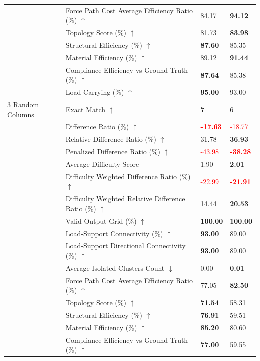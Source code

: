 \begin{table}[!h]
{\begin{tabular}{llll}
 & Force Path Cost Average Efficiency Ratio (\%) $\uparrow$ & 84.17 & \textbf{94.12} \\
 & Topology Score (\%) $\uparrow$ & 81.73 & \textbf{83.98} \\
 & Structural Efficiency (\%) $\uparrow$ & \textbf{87.60} & 85.35 \\
 & Material Efficiency (\%) $\uparrow$ & 89.12 & \textbf{91.44} \\
 & Compliance Efficiency vs Ground Truth (\%) $\uparrow$ & \textbf{87.64} & 85.38 \\
 & Load Carrying (\%) $\uparrow$ & \textbf{95.00} & 93.00 \\
3 Random Columns & Exact Match $\uparrow$ & \textbf{7} & 6 \\
 & Difference Ratio (\%) $\uparrow$ & \textbf{\textcolor{red}{-17.63}} & \textcolor{red}{-18.77} \\
 & Relative Difference Ratio (\%) $\uparrow$ & 31.78 & \textbf{36.93} \\
 & Penalized Difference Ratio (\%) $\uparrow$ & \textcolor{red}{-43.98} & \textbf{\textcolor{red}{-38.28}} \\
 & Average Difficulty Score & 1.90 & \textbf{2.01} \\
 & Difficulty Weighted Difference Ratio (\%) $\uparrow$ & \textcolor{red}{-22.99} & \textbf{\textcolor{red}{-21.91}} \\
 & Difficulty Weighted Relative Difference Ratio (\%) $\uparrow$ & 14.44 & \textbf{20.53} \\
 & Valid Output Grid (\%) $\uparrow$ & \textbf{100.00} & \textbf{100.00} \\
 & Load-Support Connectivity (\%) $\uparrow$ & \textbf{93.00} & 89.00 \\
 & Load-Support Directional Connectivity (\%) $\uparrow$ & \textbf{93.00} & 89.00 \\
 & Average Isolated Clusters Count $\downarrow$ & 0.00 & \textbf{0.01} \\
 & Force Path Cost Average Efficiency Ratio (\%) $\uparrow$ & 77.05 & \textbf{82.50} \\
 & Topology Score (\%) $\uparrow$ & \textbf{71.54} & 58.31 \\
 & Structural Efficiency (\%) $\uparrow$ & \textbf{76.91} & 59.51 \\
 & Material Efficiency (\%) $\uparrow$ & \textbf{85.20} & 80.60 \\
 & Compliance Efficiency vs Ground Truth (\%) $\uparrow$ & \textbf{77.00} & 59.55 \\

\end{tabular}}
\end{table}
